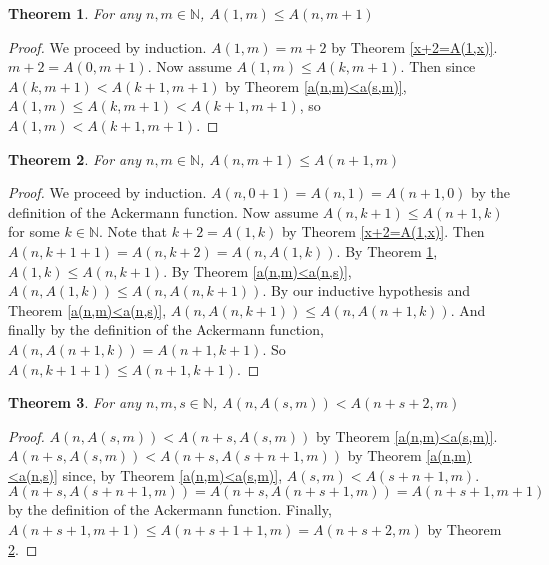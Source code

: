 \documentclass[12pt, letterpaper]{article}
\newtheorem{theorem}{Theorem}
\theoremstyle{case}
\begin{document}
    \begin{theorem}
      \label{a(1,m)<=A(n,m+1)}
      For any $n, m \in \mathbb{N}$, $A(1, m) \leq A(n, m + 1)$
    \end{theorem}
    \begin{proof}
      We proceed by induction.
      $A(1, m) = m + 2$ by Theorem \ref{x+2=A(1,x)}.
      $m + 2 = A(0, m + 1)$.
      Now assume $A(1, m) \leq A(k, m + 1)$.
      Then since $A(k, m + 1) < A(k + 1, m + 1)$ by Theorem \ref{a(n,m)<a(s,m)},
      $A(1, m) \leq A(k, m + 1) < A(k + 1, m + 1)$, so
      $A(1, m) < A(k + 1, m + 1)$.
    \end{proof}


    \begin{theorem}
      \label{a(n,m+1)<=a(n+1,m)}
      For any $n, m \in \mathbb{N}$, $A(n, m + 1) \leq A(n + 1, m)$
    \end{theorem}
    \begin{proof}
      We proceed by induction.
      $A(n, 0 + 1) = A(n, 1) = A(n + 1, 0)$ by the definition of the Ackermann function.
      Now assume $A(n, k + 1) \leq A(n + 1, k)$ for some $k \in \mathbb{N}$.
      Note that $k + 2 = A(1, k)$ by Theorem \ref{x+2=A(1,x)}.
      Then $A(n, k + 1 + 1) = A(n, k + 2) = A(n, A(1, k))$.
      By Theorem \ref{a(1,m)<=A(n,m+1)}, $A(1, k) \leq A(n, k + 1)$.
      By Theorem \ref{a(n,m)<a(n,s)}, $A(n, A(1, k)) \leq A(n, A(n, k + 1))$.
      By our inductive hypothesis and Theorem \ref{a(n,m)<a(n,s)},
      $A(n, A(n, k + 1)) \leq A(n, A(n + 1, k))$.
      And finally by the definition of the Ackermann function,
      $A(n, A(n + 1, k)) = A(n + 1, k + 1)$.
      So $A(n, k + 1 + 1) \leq A(n + 1, k + 1)$.
    \end{proof}

    \begin{theorem}
      \label{plus2}
      For any $n, m, s \in \mathbb{N}$, $A(n, A(s, m)) < A(n + s + 2, m)$
    \end{theorem}
    \begin{proof}
      $A(n, A(s, m)) < A(n + s, A(s, m))$ by Theorem \ref{a(n,m)<a(s,m)}.
      $A(n + s, A(s, m)) < A(n + s, A(s + n + 1, m))$ by Theorem \ref{a(n,m)<a(n,s)} since, by Theorem \ref{a(n,m)<a(s,m)},
      $A(s, m) < A(s + n + 1, m)$.
      $A(n + s, A(s + n + 1, m)) = A(n + s, A(n + s + 1, m)) = A(n + s + 1, m + 1)$ by the definition of the Ackermann function.
      Finally, $A(n + s + 1, m + 1) \leq A(n + s + 1 + 1, m) = A(n + s + 2, m)$ by Theorem \ref{a(n,m+1)<=a(n+1,m)}.
    \end{proof}
    
\end{document}
